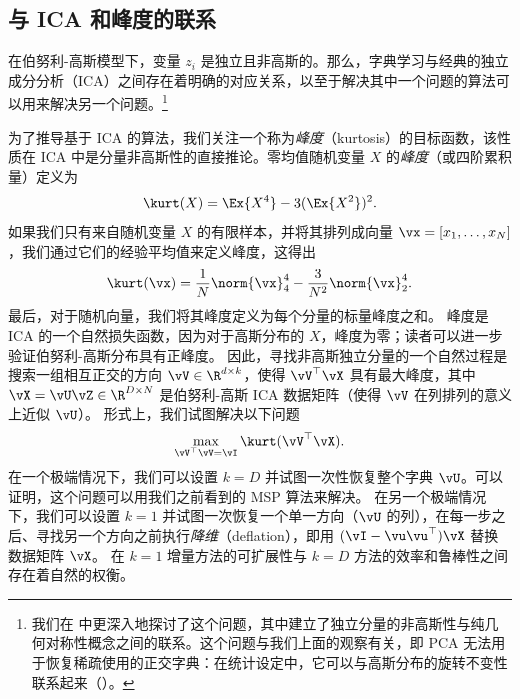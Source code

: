 \documentclass[../../book-main_zh.tex]{subfiles}
\begin{document}
\subsection{与 ICA 和峰度的联系}
在伯努利-高斯模型下，变量 $z_i$
是独立且非高斯的。那么，字典学习与经典的独立成分分析（ICA）之间存在着明确的对应关系，以至于解决其中一个问题的算法可以用来解决另一个问题。\footnote{我们在
    中更深入地探讨了这个问题，其中建立了独立分量的非高斯性与纯几何对称性概念之间的联系。这个问题与我们上面的观察有关，即 PCA
无法用于恢复稀疏使用的正交字典：在统计设定中，它可以与高斯分布的旋转不变性联系起来（）。}

为了推导基于 ICA 的算法，我们关注一个称为\textit{峰度}（kurtosis）的目标函数，该性质在 ICA 中是分量非高斯性的直接推论。零均值随机变量 $X$ 的\textit{峰度}（或四阶累积量）定义为
\begin{equation}\label{eq:kurtosis}
    \kurt(X) = \Ex{X^4} - 3 (\Ex{X^2})^2.
\end{equation}
如果我们只有来自随机变量 $X$ 的有限样本，并将其排列成向量 $\vx = [x_1, \dots, x_N]$，我们通过它们的经验平均值来定义峰度，这得出
\begin{equation}\label{eq:kurtosis-vector}
    \kurt(\vx) = \frac{1}{N} \norm{\vx}_4^4 - \frac{3}{N^2} \norm{\vx}_2^4.
\end{equation}
最后，对于随机向量，我们将其峰度定义为每个分量的标量峰度之和。
峰度是 ICA 的一个自然损失函数，因为对于高斯分布的 $X$，峰度为零；读者可以进一步验证伯努利-高斯分布具有正峰度。
因此，寻找非高斯独立分量的一个自然过程是搜索一组相互正交的方向 $\vV \in \R^{d \times k}$，使得
$\vV^\top \vX$ 具有最大峰度，其中 $\vX = \vU \vZ \in \R^{D \times N}$ 是伯努利-高斯
ICA 数据矩阵（使得 $\vV$ 在列排列的意义上近似 $\vU$）。
形式上，我们试图解决以下问题
\begin{equation}
    \max_{\vV^\top \vV = \vI} \kurt(\vV^\top \vX).
\end{equation}
在一个极端情况下，我们可以设置 $k = D$ 并试图一次性恢复整个字典 $\vU$。可以证明，这个问题可以用我们之前看到的 MSP 算法来解决。
在另一个极端情况下，我们可以设置 $k=1$ 并试图一次恢复一个单一方向（$\vU$
的列），在每一步之后、寻找另一个方向之前执行\textit{降维}（deflation），即用 $(\vI - \vu\vu^\top)
\vX$ 替换数据矩阵 $\vX$。
在 $k=1$ 增量方法的可扩展性与 $k=D$ 方法的效率和鲁棒性之间存在着自然的权衡。
\end{document}
